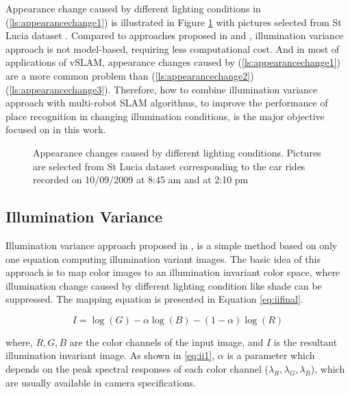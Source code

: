 Appearance change caused by different lighting conditions in (\ref{ls:appearancechange1}) is illustrated in Figure \ref{fig:shadecompare1} with pictures selected from St Lucia dataset \cite{glover2010fab}. Compared to approaches proposed in \cite{mcmanus2013distraction} and \cite{churchill2012practice}, illumination variance approach is not model-based, requiring less computational cost. And in most of applications of vSLAM, appearance changes caused by (\ref{ls:appearancechange1}) are a more common problem than (\ref{ls:appearancechange2})(\ref{ls:appearancechange3}). Therefore, how to combine illumination variance approach with multi-robot SLAM algorithms, to improve the performance of place recognition in changing illumination conditions, is the major objective focused on in this work.

\begin{figure}
	\centering
\caption{Appearance changes caused by different lighting conditions. Pictures are selected from St Lucia dataset corresponding to the car rides recorded on 10/09/2009 at 8:45 am and at 2:10 pm}
\label{fig:shadecompare1}
\end{figure}


\subsection{Illumination Variance}
Illumination variance approach proposed in \cite{maddern2014illumination}, is a simple method based on only one equation computing illumination variant images. The basic idea of this approach is to map color images to an illumination invariant color space, where illumination change caused by different lighting condition like shade can be suppressed. The mapping equation
 is presented in Equation \ref{eq:iifinal}.
 
\begin{equation}
I=\log(G)-\alpha\log(B)-(1-\alpha)\log(R)
\label{eq:iifinal}
\end{equation}

where, $R, G, B$ are the color channels of the input image, and $I$ is the resultant illumination invariant image. As shown in \ref{eq:ii1}, $\alpha$ is a parameter which depends on the peak spectral responses of each color channel ($\lambda_R, \lambda_G, \lambda_B$), which are usually available in camera specifications.

